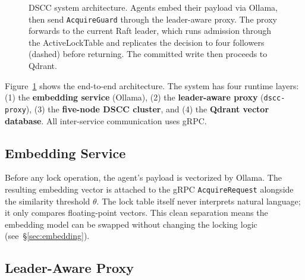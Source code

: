 \documentclass[sigconf]{acmart}
\begin{document}
\begin{figure}[t]
  \caption{DSCC system architecture. Agents embed their payload via Ollama, then send
    \texttt{AcquireGuard} through the leader-aware proxy. The proxy forwards to the
    current Raft leader, which runs admission through the ActiveLockTable and replicates
    the decision to four followers (dashed) before returning. The committed write then
    proceeds to Qdrant.}
  \label{fig:arch}
\end{figure}

Figure~\ref{fig:arch} shows the end-to-end architecture. The system has four runtime
layers: (1) the \textbf{embedding service} (Ollama), (2) the \textbf{leader-aware
proxy} (\texttt{dscc-proxy}), (3) the \textbf{five-node DSCC cluster}, and (4) the
\textbf{Qdrant vector database}. All inter-service communication uses gRPC.

\subsection{Embedding Service}

Before any lock operation, the agent's payload is vectorized by Ollama. The resulting
embedding vector is attached to the gRPC \texttt{AcquireRequest} alongside the similarity
threshold $\theta$. The lock table itself never interprets natural language; it only
compares floating-point vectors. This clean separation means the embedding model can be
swapped without changing the locking logic (see~\S\ref{sec:embedding}).

\subsection{Leader-Aware Proxy}
\label{sec:proxy}
\end{document}
